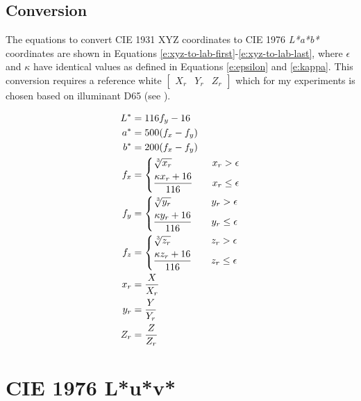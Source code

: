 \subsection*{Conversion}

The equations to convert CIE 1931 XYZ coordinates to CIE 1976
\emph{L*a*b*} coordinates are shown in Equations
\ref{e:xyz-to-lab-first}-\ref{e:xyz-to-lab-last}, where $\epsilon$ and
$\kappa$ have identical values as defined in Equations \ref{e:epsilon}
and \ref{e:kappa}. This conversion requires a reference white
$\begin{bmatrix}X_r & Y_r & Z_r\end{bmatrix}$ which for my experiments
is chosen based on illuminant D65 (see ).

\begin{align}
L^{*}& = 116f_y - 16
\label{e:xyz-to-lab-first} \\
a^{*}& = 500(f_x - f_y) \\
b^{*}& = 200(f_x - f_y) \\
f_x& = \left\{
\begin{aligned}
&\sqrt[\leftroot{-1}\uproot{2}3]{x_r} & \quad x_r > \epsilon \\
&\frac{\kappa x_r + 16}{116} & \quad x_r \leq \epsilon
\end{aligned}
\right. \\
f_y& = \left\{
\begin{aligned}
&\sqrt[\leftroot{-1}\uproot{2}3]{y_r} & \quad y_r > \epsilon \\
&\frac{\kappa y_r + 16}{116} & \quad y_r \leq \epsilon
\end{aligned}
\right. \\
f_z& = \left\{
\begin{aligned}
&\sqrt[\leftroot{-1}\uproot{2}3]{z_r} & \quad z_r > \epsilon \\
&\frac{\kappa z_r + 16}{116} & \quad z_r \leq \epsilon
\end{aligned}
\right. \\
x_r& = \frac{X}{X_r} \\
y_r& = \frac{Y}{Y_r} \\
Z_r& = \frac{Z}{Z_r}
\label{e:xyz-to-lab-last}
\end{align}

\section{CIE 1976 L*u*v*}
\label{s:luv}

